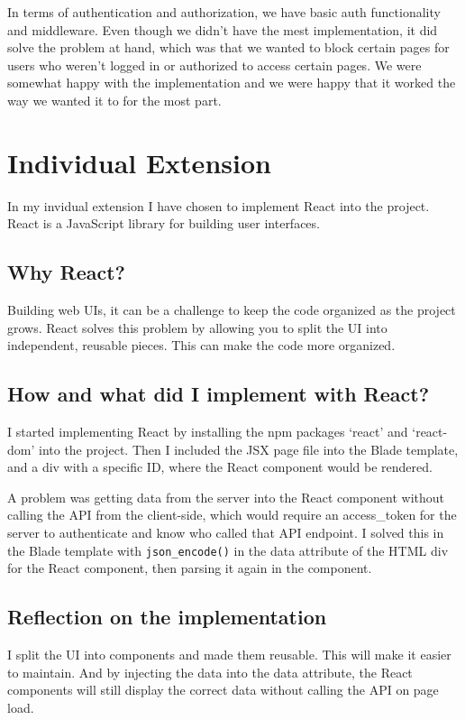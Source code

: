 \documentclass[letterpaper,twocolumn]{article}
\begin{document}
In terms of authentication and authorization, we have basic auth functionality and middleware.
Even though we didn't have the mest implementation, it did solve the problem at hand, which was that we wanted to block certain pages for users who weren't logged in or authorized to access certain pages.
We were somewhat happy with the implementation and we were happy that it worked the way we wanted it to for the most part.


\section{Individual Extension}

In my invidual extension I have chosen to implement React into the project.
React is a JavaScript library for building user interfaces.

\subsection{Why React?}

Building web UIs, it can be a challenge to keep the code organized as the project grows.
React solves this problem by allowing you to split the UI into independent, reusable pieces.
This can make the code more organized.

\subsection{How and what did I implement with React?}

I started implementing React by installing the npm packages `react' and `react-dom' into the project.
Then I included the JSX page file into the Blade template, and a div with a specific ID, where the React component would be rendered.

A problem was getting data from the server into the React component without calling the API from the client-side, which would require an access\_token for the server to authenticate and know who called that API endpoint.
I solved this in the Blade template with \texttt{json_encode()} in the data attribute of the HTML div for the React component, then parsing it again in the component.

\subsection{Reflection on the implementation}

I split the UI into components and made them reusable.
This will make it easier to maintain.
And by injecting the data into the data attribute,
the React components will still display the correct data without calling the API on page load.
\end{document}
